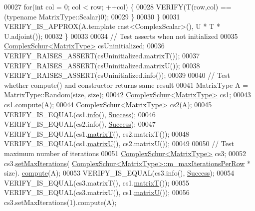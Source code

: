 \begin{DoxyCode}
00027       \textcolor{keywordflow}{for}(\textcolor{keywordtype}{int} col = 0; col < row; ++col) \{
00028         VERIFY(T(row,col) == (\textcolor{keyword}{typename} MatrixType::Scalar)0);
00029       \}
00030     \}
00031     VERIFY\_IS\_APPROX(A.template cast<ComplexScalar>(), U * T * U.adjoint());
00032   \}
00033 
00034   \textcolor{comment}{// Test asserts when not initialized}
00035   \hyperlink{group___eigenvalues___module}{ComplexSchur<MatrixType>} csUninitialized;
00036   VERIFY\_RAISES\_ASSERT(csUninitialized.matrixT());
00037   VERIFY\_RAISES\_ASSERT(csUninitialized.matrixU());
00038   VERIFY\_RAISES\_ASSERT(csUninitialized.info());
00039   
00040   \textcolor{comment}{// Test whether compute() and constructor returns same result}
00041   MatrixType A = MatrixType::Random(size, size);
00042   \hyperlink{group___eigenvalues___module}{ComplexSchur<MatrixType>} cs1;
00043   cs1.\hyperlink{group___eigenvalues___module_a3543d2c286563108cd9ace672bbb1c09}{compute}(A);
00044   \hyperlink{group___eigenvalues___module}{ComplexSchur<MatrixType>} cs2(A);
00045   VERIFY\_IS\_EQUAL(cs1.\hyperlink{group___eigenvalues___module_a8c5ee15fecfd126fc362c3f2fd28f51e}{info}(), \hyperlink{group__enums_gga85fad7b87587764e5cf6b513a9e0ee5ea52581b035f4b59c203b8ff999ef5fcea}{Success});
00046   VERIFY\_IS\_EQUAL(cs2.info(), \hyperlink{group__enums_gga85fad7b87587764e5cf6b513a9e0ee5ea52581b035f4b59c203b8ff999ef5fcea}{Success});
00047   VERIFY\_IS\_EQUAL(cs1.\hyperlink{group___eigenvalues___module_add3ab5ed83f7f2f06b79fa910a2d5684}{matrixT}(), cs2.matrixT());
00048   VERIFY\_IS\_EQUAL(cs1.\hyperlink{group___eigenvalues___module_afed8177cf9836f032d42bdb6c6bc6e01}{matrixU}(), cs2.matrixU());
00049 
00050   \textcolor{comment}{// Test maximum number of iterations}
00051   \hyperlink{group___eigenvalues___module}{ComplexSchur<MatrixType>} cs3;
00052   cs3.\hyperlink{group___eigenvalues___module_a6ca227fbd5387f3a625351354b8eec44}{setMaxIterations}(
      \hyperlink{group___eigenvalues___module_class_eigen_1_1_complex_schur}{ComplexSchur<MatrixType>::m\_maxIterationsPerRow} * size).
      \hyperlink{group___eigenvalues___module_a3543d2c286563108cd9ace672bbb1c09}{compute}(A);
00053   VERIFY\_IS\_EQUAL(cs3.info(), \hyperlink{group__enums_gga85fad7b87587764e5cf6b513a9e0ee5ea52581b035f4b59c203b8ff999ef5fcea}{Success});
00054   VERIFY\_IS\_EQUAL(cs3.matrixT(), cs1.\hyperlink{group___eigenvalues___module_add3ab5ed83f7f2f06b79fa910a2d5684}{matrixT}());
00055   VERIFY\_IS\_EQUAL(cs3.matrixU(), cs1.\hyperlink{group___eigenvalues___module_afed8177cf9836f032d42bdb6c6bc6e01}{matrixU}());
00056   cs3.setMaxIterations(1).compute(A);

\end{DoxyCode}
